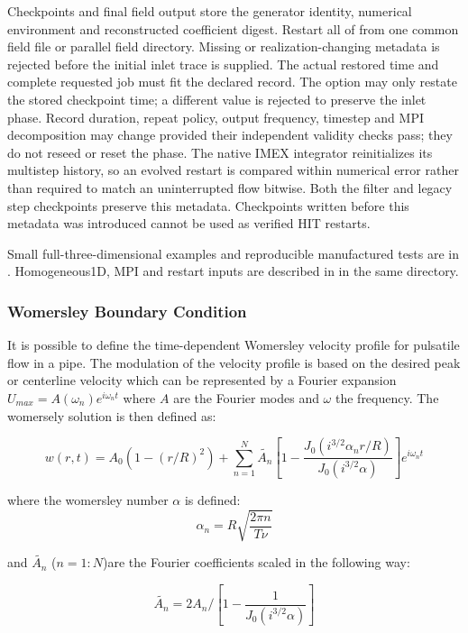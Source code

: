 Checkpoints and final field output store the generator identity, numerical
environment and reconstructed coefficient digest. Restart all of
 from one common field file or parallel field directory.
Missing or realization-changing metadata is rejected before the initial inlet
trace is supplied. The actual restored time and complete requested job must
fit the declared record. The  option may only restate
the stored checkpoint time;
a different value is rejected to preserve the inlet phase. Record duration,
repeat policy, output frequency,
timestep and MPI decomposition may change provided their independent validity
checks pass; they do not reseed or reset the phase. The native IMEX integrator
reinitializes its multistep history, so an evolved restart is compared within
numerical error rather than required to match an uninterrupted flow bitwise.
Both the  filter and legacy step checkpoints preserve this
metadata. Checkpoints written before this metadata was introduced cannot be
used as verified HIT restarts.

Small full-three-dimensional examples and reproducible manufactured tests are
in .
Homogeneous1D, MPI and restart inputs are described in 
in the same directory.

\subsubsection{Womersley Boundary Condition}

It is possible to define the time-dependent Womersley velocity profile
for pulsatile flow in a pipe. The modulation of the velocity profile
is based on the desired peak or centerline velocity which can be
represented by a Fourier expansion $U_{max}=A(\omega_n)e^{i\omega_n
  t}$ where $A$ are the Fourier modes and $\omega $ the frequency. The
womersely solution is then defined as:

$$ w(r,t) = A_0(1-(r/R)^2) + \sum_{n=1}^N
\tilde{A_n}[1-\frac{J_0(i^{3/2}\alpha_n r/R)}{J_0(i^{3/2}
    \alpha)}]e^{i\omega_n t} $$

where the womersley number $\alpha$ is defined:
$$ \alpha_n = R\sqrt{\frac{2\pi n}{T\nu}}$$

and $\tilde{A_n}$ ($n=1:N$)are the Fourier coefficients scaled in the
following way:

$$ \tilde{A_n} = 2A_n/[1 - \frac{1}{J_0(i^{3/2}\alpha)}] $$

